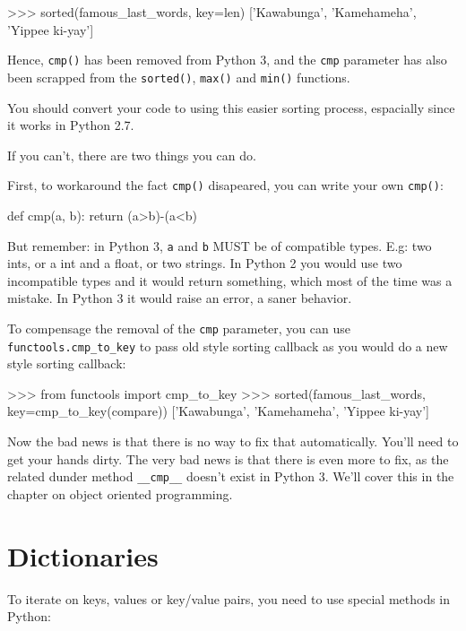 \begin{py2and3}
>>> sorted(famous_last_words, key=len)
['Kawabunga', 'Kamehameha', 'Yippee ki-yay']
\end{py2and3}

Hence, \lstinline{cmp()} has been removed from Python 3, and the \lstinline{cmp} parameter has also been scrapped from the \lstinline{sorted()}, \lstinline{max()} and \lstinline{min()} functions.

You should convert your code to using this easier sorting process, espacially since it works in Python 2.7.

If you can't, there are two things you can do.

First, to workaround the fact \lstinline{cmp()} disapeared, you can write your own \lstinline{cmp()}:

\begin{py2and3}
def cmp(a, b):
    return (a>b)-(a<b)
\end{py2and3}

But remember: in Python 3, \lstinline{a} and \lstinline{b} MUST be of compatible types. E.g: two ints, or a int and a float, or two strings. In Python 2 you would use two incompatible types and it would return something, which most of the time was a mistake. In Python 3 it would raise an error, a saner behavior.

To compensage the removal of the \lstinline{cmp} parameter, you can use \lstinline{functools.cmp_to_key} to pass old style sorting callback as you would do a new style sorting callback:

\begin{py2and3}
>>> from functools import cmp_to_key
>>> sorted(famous_last_words, key=cmp_to_key(compare))
['Kawabunga', 'Kamehameha', 'Yippee ki-yay']
\end{py2and3}

Now the bad news is that there is no way to fix that automatically. You'll need to get your hands dirty. The very bad news is that there is even more to fix, as the related \gls{dunder} method \lstinline{__cmp__} doesn't exist in Python 3. We'll cover this in the chapter on object oriented programming.


\section{Dictionaries}

To iterate on keys, values or key/value pairs, you need to use special methods in Python:

